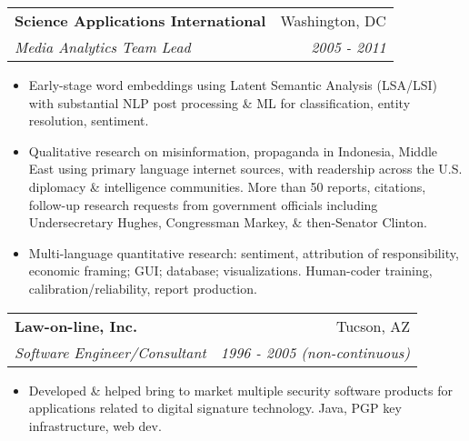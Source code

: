\documentclass[letterpaper,11pt]{article}
\makeatletter
\newcommand{\resitem}[1]{\item #1 \vspace{-6pt}}
\newcommand{\ressubheading}[4]{\vspace{2pt}
\begin{tabular*}{7.58in}{l@{\extracolsep{\fill}}r}
		\textbf{#1} & #2 \\
		\textit{#3} & \textit{#4} \\
\end{tabular*}\vspace{-1pt}}
\makeatother
\begin{document}
\ressubheading{Science Applications International}{Washington, DC}{Media Analytics Team Lead}{2005 - 2011}
\begin{itemize}
\resitem{Early-stage word embeddings using Latent Semantic Analysis (LSA/LSI) with substantial NLP post processing \& ML for classification, entity resolution, sentiment.}
\resitem{Qualitative research on misinformation, propaganda in Indonesia, Middle East using primary language internet sources, with readership across the U.S. diplomacy \& intelligence communities. More than 50 reports, citations, follow-up research requests from government officials including Undersecretary Hughes, Congressman Markey, \& then-Senator Clinton.}
\resitem{Multi-language quantitative research: sentiment, attribution of responsibility, economic framing; GUI; database; visualizations.  Human-coder training, calibration/reliability, report production.}
\end{itemize} 



\ressubheading{Law-on-line, Inc.}{Tucson, AZ}{Software Engineer/Consultant}
{1996 - 2005 (non-continuous)}
\begin{itemize}
\resitem{Developed \& helped bring to market multiple security software products for 
applications related to digital signature technology. Java, PGP key infrastructure, web dev.}
\end{itemize}

\vspace{0.1in}
\end{document}
